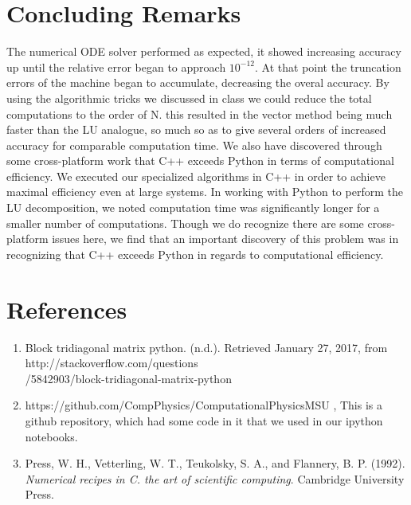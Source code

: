 \documentclass{article}
\begin{document}
\section{Concluding Remarks}
The numerical ODE solver performed as expected, it showed increasing accuracy up until the relative error began to approach $10^{-12}$. At that point the truncation errors of the machine began to accumulate, decreasing the overal accuracy. 
By using the algorithmic tricks we discussed in class we could reduce the total computations to the order of N. this resulted in the vector method being much faster than the LU analogue, so much so as to give several orders of increased accuracy for comparable computation time.  We also have discovered through some cross-platform work that C++ exceeds Python in terms of computational efficiency. We executed our specialized algorithms in C++ in order to achieve maximal efficiency even at large systems. In working with Python to perform the LU decomposition, we noted computation time was significantly longer for a smaller number of computations. Though we do recognize there are some cross-platform issues here, we find that an important discovery of this problem was in recognizing that C++ exceeds Python in regards to computational efficiency.

\section{References}
\begin{enumerate}
	\item  Block tridiagonal matrix python. (n.d.). Retrieved January 27, 2017, from http://stackoverflow.com/questions\\/5842903/block-tridiagonal-matrix-python
	
	\item https://github.com/CompPhysics/ComputationalPhysicsMSU , This is a github repository, which had some code in it that we used in our ipython notebooks.
	
	
	
	\item Press, W. H., Vetterling, W. T., Teukolsky, S. A., and Flannery, B. P. (1992). \textit{Numerical recipes in C. the art of scientific computing}. Cambridge University Press.
\end{enumerate}
\end{document}
